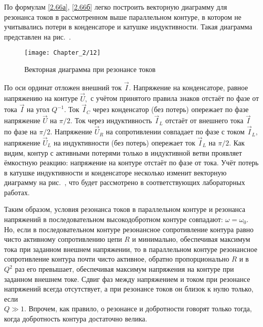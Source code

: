 По формулам \eqref{2.66а}, \eqref{2.66б} легко построить векторную диаграмму для резонанса токов в рассмотренном выше параллельном контуре, в котором не учитывались потери в конденсаторе и катушке индуктивности. Такая диаграмма представлен на рис.~.

\begin{figure}[h!]
	\centering\texttt{[image: Chapter\_2/12]}
	\caption{Векторная диаграмма при резонансе токов}
\end{figure}

По оси ординат отложен внешний ток $\vec I.$ Напряжение на конденсаторе, равное напряжению на контуре $\vec U,$ с учётом принятого правила знаков отстаёт по фазе от тока $\vec I$ на угол $Q^{-1}.$ Ток $\vec I_C$ через конденсатор (без потерь) опережает по фазе напряжение $\vec U$ на $\pi/2.$ Ток через индуктивность $\vec I_L$ отстаёт от внешнего тока $\vec I$ по фазе на $\pi/2.$  Напряжение $\vec U_R$ на сопротивлении совпадает по фазе с током $\vec I_L,$ напряжение $\vec U_L$ на индуктивности (без потерь) опережает ток $\vec I_L$ на $\pi/2.$ Как видим, контур с активными потерями только в индуктивной ветви проявляет ёмкостную реакцию: напряжение на контуре отстаёт по фазе от тока. Учёт потерь в катушке индуктивности и конденсаторе несколько изменит векторную диаграмму на рис.~, что будет рассмотрено в соответствующих лабораторных работах.

Таким образом, условия резонанса токов в параллельном контуре и резонанса напряжений в последовательном высокодобротном контуре совпадают: $\omega=\omega_0.$ Но, если в последовательном контуре резонансное сопротивление контура равно чисто активному сопротивлению цепи $R$ и минимально, обеспечивая максимум тока при заданном внешнем напряжении, то в параллельном контуре резонансное сопротивление контура почти чисто активное, обратно пропорционально $R$ и в $Q^2$ раз его превышает, обеспечивая максимум напряжения на контуре при заданном внешнем токе. Сдвиг фаз между напряжением и током при резонансе напряжений всегда отсутствует, а при резонансе токов он близок к нулю только, если \\$Q\gg1.$ Впрочем, как правило, о резонансе и добротности говорят только тогда, когда добротность контура достаточно велика.


